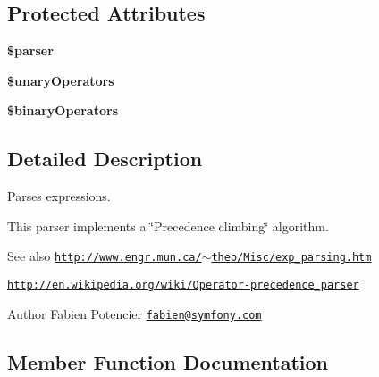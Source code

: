 \subsection*{Protected Attributes}
\begin{DoxyCompactItemize}
\item 
\hypertarget{class_twig___expression_parser_a147a766daa03d52576c7345fea31c945}{}{\bfseries \$parser}\label{class_twig___expression_parser_a147a766daa03d52576c7345fea31c945}

\item 
\hypertarget{class_twig___expression_parser_ae627d836785e9074fdd05ea18ed73415}{}{\bfseries \$unary\+Operators}\label{class_twig___expression_parser_ae627d836785e9074fdd05ea18ed73415}

\item 
\hypertarget{class_twig___expression_parser_a0daebcbd551638ff610aee2905c70974}{}{\bfseries \$binary\+Operators}\label{class_twig___expression_parser_a0daebcbd551638ff610aee2905c70974}

\end{DoxyCompactItemize}


\subsection{Detailed Description}
Parses expressions.

This parser implements a \char`\"{}\+Precedence climbing\char`\"{} algorithm.

\begin{DoxySeeAlso}{See also}
\href{http://www.engr.mun.ca/~theo/Misc/exp_parsing.htm}{\tt http\+://www.\+engr.\+mun.\+ca/$\sim$theo/\+Misc/exp\+\_\+parsing.\+htm} 

\href{http://en.wikipedia.org/wiki/Operator-precedence_parser}{\tt http\+://en.\+wikipedia.\+org/wiki/\+Operator-\/precedence\+\_\+parser}
\end{DoxySeeAlso}
\begin{DoxyAuthor}{Author}
Fabien Potencier \href{mailto:fabien@symfony.com}{\tt fabien@symfony.\+com} 
\end{DoxyAuthor}


\subsection{Member Function Documentation}
\hypertarget{class_twig___expression_parser_ab55e89493a082dc4ec12ebf98482f066}{}
